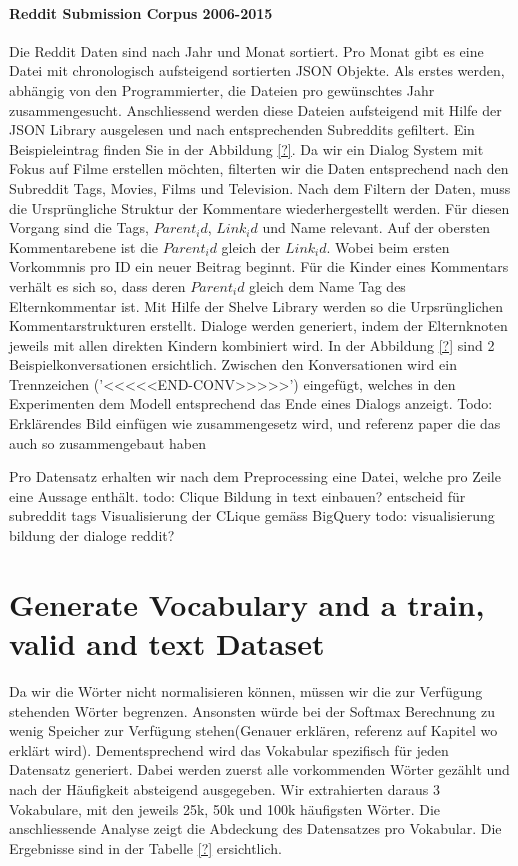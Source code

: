 \paragraph{Reddit Submission Corpus 2006-2015} Die Reddit Daten sind nach Jahr und Monat sortiert. Pro Monat gibt es eine Datei mit chronologisch aufsteigend sortierten JSON Objekte.
Als erstes werden, abhängig von den Programmierter, die Dateien pro gewünschtes Jahr zusammengesucht. Anschliessend werden diese Dateien aufsteigend mit Hilfe der JSON Library ausgelesen und nach entsprechenden Subreddits gefiltert. Ein Beispieleintrag finden Sie in der Abbildung \ref{?}. Da wir ein Dialog System mit Fokus auf Filme erstellen möchten, filterten wir die Daten entsprechend nach den Subreddit Tags, Movies, Films und Television. Nach dem Filtern der Daten, muss die Ursprüngliche Struktur der Kommentare wiederhergestellt werden. Für diesen Vorgang sind die Tags, $Parent_id$, $Link_id$ und Name relevant. Auf der obersten Kommentarebene ist die $Parent_id$ gleich der $Link_id$. Wobei beim ersten Vorkommnis pro ID ein neuer Beitrag beginnt. Für die Kinder eines Kommentars verhält es sich so, dass deren $Parent_id$ gleich dem Name Tag des Elternkommentar ist. Mit Hilfe der Shelve Library werden so die Urpsrünglichen Kommentarstrukturen erstellt. Dialoge werden generiert, indem der Elternknoten jeweils mit allen direkten Kindern kombiniert wird. In der Abbildung \ref{?} sind 2 Beispielkonversationen ersichtlich. Zwischen den Konversationen wird ein Trennzeichen ('<<<<<END-CONV>>>>>') eingefügt, welches in den Experimenten dem Modell entsprechend das Ende eines Dialogs anzeigt.
Todo: Erklärendes Bild einfügen wie zusammengesetz wird, und referenz paper die das auch so zusammengebaut haben

Pro Datensatz erhalten wir nach dem Preprocessing eine Datei, welche pro Zeile eine Aussage enthält.
todo: Clique Bildung in text einbauen? entscheid für subreddit tags Visualisierung der CLique gemäss BigQuery
todo: visualisierung bildung der dialoge reddit?
\section{Generate Vocabulary and a train, valid and text Dataset}
Da wir die Wörter nicht normalisieren können, müssen wir die zur Verfügung stehenden Wörter begrenzen. Ansonsten würde bei der Softmax Berechnung zu wenig Speicher zur Verfügung stehen(Genauer erklären, referenz auf Kapitel wo erklärt wird). Dementsprechend wird das Vokabular spezifisch für jeden Datensatz generiert.
Dabei werden zuerst alle vorkommenden Wörter gezählt und nach der Häufigkeit absteigend ausgegeben. Wir extrahierten daraus 3 Vokabulare, mit den jeweils 25k, 50k und 100k häufigsten Wörter. Die anschliessende Analyse zeigt die Abdeckung des Datensatzes pro Vokabular. Die Ergebnisse sind in der Tabelle \ref{?} ersichtlich.

